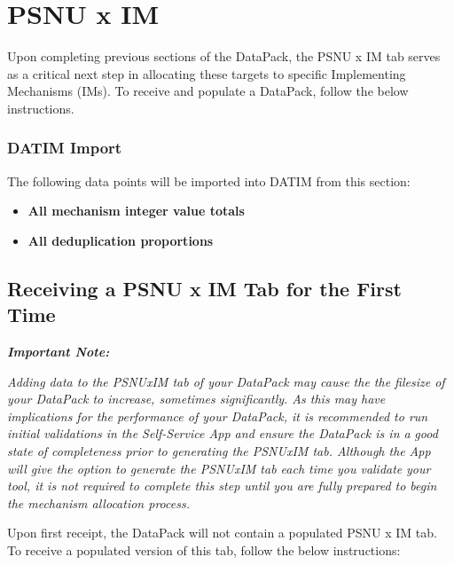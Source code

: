 \documentclass[
  openany]{book}
\begin{document}
\hypertarget{psnu-x-im}{%
\chapter{PSNU x IM}\label{psnu-x-im}}

Upon completing previous sections of the DataPack, the PSNU x IM tab
serves as a critical next step in allocating these targets to specific
Implementing Mechanisms (IMs). To receive and populate a DataPack,
follow the below instructions.

\hypertarget{datim-import-62}{%
\subsection{DATIM Import}\label{datim-import-62}}

The following data points will be imported into DATIM from this section:

\begin{itemize}
\item
  \textbf{All mechanism integer value totals}
\item
  \textbf{All deduplication proportions}
\end{itemize}

\hypertarget{receiving-a-psnu-x-im-tab-for-the-first-time}{%
\section{Receiving a PSNU x IM Tab for the First Time}\label{receiving-a-psnu-x-im-tab-for-the-first-time}}

\textbf{\emph{Important Note:}}

\emph{Adding data to the PSNUxIM tab of your DataPack may cause the the
filesize of} \emph{your DataPack to increase, sometimes significantly. As
this may have} \emph{implications for the performance of your DataPack, it is
recommended to run} \emph{initial validations in the Self-Service App and
ensure the DataPack is in a} \emph{good state of completeness prior to
generating the PSNUxIM tab. Although the} \emph{App will give the option to
generate the PSNUxIM tab each time you validate} \emph{your tool, it is not
required to complete this step until you are fully} \emph{prepared to begin
the mechanism allocation process.}

Upon first receipt, the DataPack will not contain a populated PSNU x IM
tab. To receive a populated version of this tab, follow the below
instructions:
\end{document}
